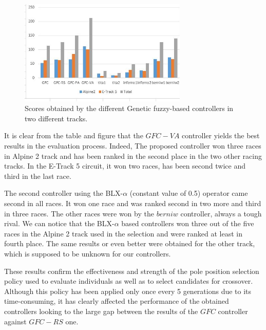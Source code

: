 \documentclass[conference]{IEEEtran}
\begin{document}
\begin{figure}[!ht]	
	\begin{center}
		\includegraphics[width=8cm]{fig/gfc_races.jpg}
		\caption{Scores obtained by the different Genetic fuzzy-based controllers in two different tracks.}
		\label{fig:gfc_races}
	\end{center}
\end{figure}
It is clear from the table and figure that the $GFC-VA$ controller
yields the best results in the evaluation process. Indeed, The
proposed controller won three races in Alpine 2 track and has been
ranked in the second place in the two other racing tracks. In the E-Track 5
circuit, it won two races, has been second twice and third in
the last race.

The second controller using the BLX-$\alpha$ (constant value of 0.5)
operator came second in all races. It won one race and was ranked
second in two more and third in three races.
The other races were won by the $berniw$ controller, always a tough rival.
We can notice that the BLX-$\alpha$ based controllers won three out of the five races in the Alpine 2 track used in the selection and were ranked at least in fourth place.
The same results or even  better were obtained for the other track, which is supposed to be unknown for our controllers.

These results confirm the effectiveness and strength of the pole position selection policy used to evaluate individuals as well as to select candidates for crossover. Although this policy has been applied only once every 5 generations due to its time-consuming, it has clearly affected the performance of the obtained controllers looking to the large gap between the results of the $GFC$ controller against $GFC-RS$ one.
\end{document}
